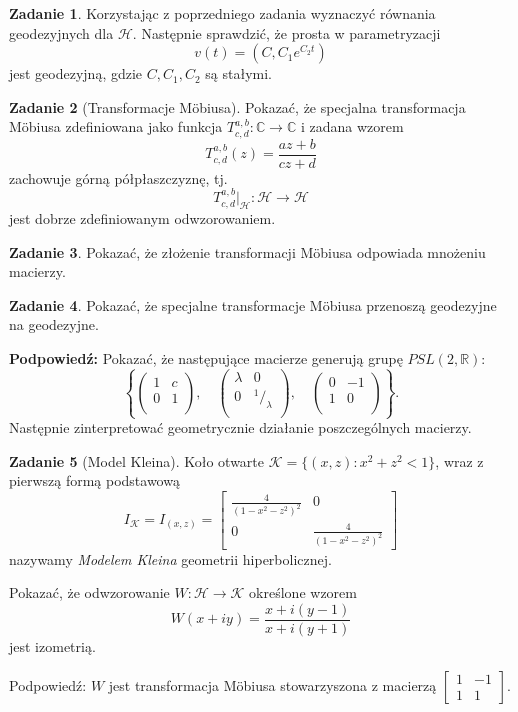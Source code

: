 \documentclass[a4paper,11pt]{article}
\theoremstyle{definition}\newtheorem{exercise}{Zadanie}
\theoremstyle{definition}\newtheorem{remark}{Uwaga}
\begin{document}
\begin{exercise}
 Korzystając z poprzedniego zadania wyznaczyć r\'ownania geodezyjnych dla 
$\mathcal{H}$. Następnie sprawdzić, że prosta w parametryzacji 
\[v(t)=(C,C_1 e^{C_2 t})\] jest geodezyjną, gdzie $C, C_{1} , C_2$ są stałymi.
\end{exercise}


\begin{exercise}[Transformacje M\"obiusa]
Pokazać, że specjalna transformacja M\"obiusa zdefiniowana jako funkcja
$T^{a,b}_{c,d}\colon \mathbb{C}\to\mathbb{C}$ i zadana wzorem
\[T^{a,b}_{c,d}(z)= \frac{az+b}{cz+d}\]
zachowuje g\'orną p\'ołpłaszczyznę, tj.
\[T^{a,b}_{c,d}\Big|_{\mathcal{H}}\colon \mathcal{H}\to \mathcal{H}\]
jest dobrze zdefiniowanym odwzorowaniem.
\end{exercise}

\begin{exercise}
Pokazać, że złożenie transformacji M\"obiusa odpowiada mnożeniu macierzy.
\end{exercise}


\begin{exercise}
Pokazać, że specjalne transformacje M\"obiusa przenoszą geodezyjne na 
geodezyjne. 

\small{\textbf{Podpowiedź:} Pokazać, że następujące macierze 
generują grupę $PSL(2,\mathbb{R})$: 
\[\left\{\left(\begin{array}{cc}
     1 & c\\
	0 & 1\\
     \end{array}
\right),\quad \left(\begin{array}{cc}
     \lambda & 0\\
	0 & ^1\!\!\big/_{\!\!\lambda}\\
     \end{array}
\right),\quad\left(\begin{array}{cc}
     0& -1\\
	1 & 0\\
     \end{array}
\right)\right\}.\]
Następnie zinterpretować geometrycznie działanie poszczególnych macierzy.}
\end{exercise}

\begin{exercise}[Model Kleina]
Koło otwarte $\mathcal{K}=\{(x,z)\colon x^2 + z ^2 < 1\}$, wraz z pierwszą 
formą podstawową
\[I_{\mathcal{K}}=I_{(x,z)}
=\left[
\begin{array}{cc}
\frac{4}{(1-x^2-z^2)^2} & 0\\
0 & \frac{4}{(1-x^2-z^2)^2}
\end{array}
\right]
\]
nazywamy \textit{Modelem Kleina} geometrii hiperbolicznej.

Pokazać, że odwzorowanie $W\colon \mathcal{H}\to \mathcal{K}$ określone wzorem
\[W(x+iy)=\frac{x+i(y-1)}{x+i(y+1)}\]jest izometrią.

\small{Podpowiedź: $W$ jest transformacja M\"obiusa stowarzyszona z 
macierzą 
$\left[
\begin{array}{cc}
1 &-1\\
1 & 1
\end{array}
\right].$}

\end{exercise}
\end{document}
